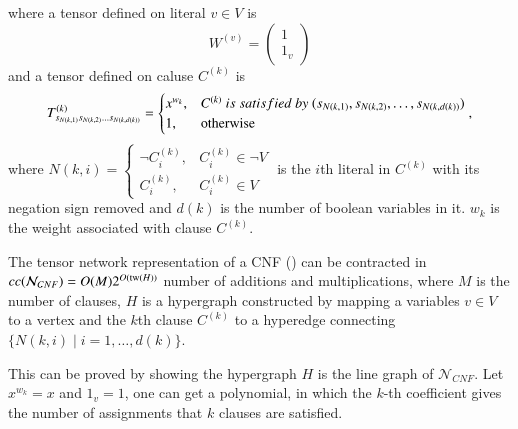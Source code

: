 \documentclass[review, onefignum, onetabnum]{siamart190516}
\begin{document}
where a tensor defined on literal $v \in V$ is
\begin{equation}
    W^{(v)} = \left(\begin{matrix}
    1\\
    1_v
    \end{matrix}\right)
\end{equation}
and a tensor defined on caluse $C^{(k)}$ is
\begin{equation}
T^{(k)}_{s_{N(k, 1)} s_{N(k, 2)} \ldots s_{N(k, d(k))}} = \begin{cases}
    x^{w_k}, &C^{(k)} ~is~ satisfied ~by~ (s_{N(k, 1)}, s_{N(k, 2)}, \ldots, s_{N(k, d(k))})\\
    1, &{\rm otherwise}
\end{cases},
\end{equation}
where $N(k, i) = \begin{cases}\neg C^{(k)}_i, &C^{(k)}_i \in \neg V\\ C^{(k)}_i, & C^{(k)}_i \in V\end{cases}$ is the $i$th literal in $C^{(k)}$ with its negation sign removed and $d(k)$ is the number of boolean variables in it.
$w_k$ is the weight associated with clause $C^{(k)}$.
\begin{theorem}\label{thm:cnfcomplex}
    The tensor network representation of a CNF () can be contracted in $cc(\mathcal{N}_{CNF}) = O(M)2^{O({\rm tw}(H))}$ number of additions and multiplications, where $M$ is the number of clauses,
    $H$ is a hypergraph constructed by mapping a variables $v\in V$ to a vertex and the $k$th clause $C^{(k)}$ to a hyperedge connecting $\{N(k, i)\mid i=1,\ldots, d(k)\}$.
\end{theorem}
This can be proved by showing the hypergraph $H$ is the line graph of $\mathcal{N}_{CNF}$.
Let $x^{w_k} = x$ and $1_v = 1$, one can get a polynomial, in which the $k$-th coefficient gives the number of assignments that $k$ clauses are satisfied.
\end{document}

